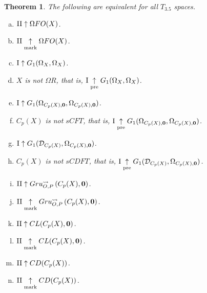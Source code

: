 \documentclass{amsart}
\theoremstyle{plain}
\newtheorem{theorem}{Theorem}
\theoremstyle{definition}
\theoremstyle{remark}
\theoremstyle{plain}
\theoremstyle{definition}
\theoremstyle{remark}
\begin{document}
\begin{theorem}
 The following are equivalent for all \(T_{3.5}\) spaces.
 \begin{enumerate}[a)]
  \item \(\mathrm{II}\uparrow \Omega FO(X)\).
  \item \(\mathrm{II}\underset{\text{mark}}{\uparrow} \Omega FO(X)\).
  \item \(\mathrm{I}\uparrow G_1(\Omega_X,\Omega_X)\).
  \item \(X\) is not \(\Omega R\), that is, \(\mathrm{I}\underset{\text{pre}}{\uparrow} G_1(\Omega_X,\Omega_X)\).
  \item \(\mathrm{I}\uparrow G_{1}(\Omega_{C_p(X),\mathbf 0},\Omega_{C_p(X),\mathbf 0})\).
  \item \(C_p(X)\) is not \(sCFT\), that is, \(\mathrm{I}\underset{\text{pre}}{\uparrow} G_{1}(\Omega_{C_p(X),\mathbf 0},\Omega_{C_p(X),\mathbf 0})\).
  \item \(\mathrm{I}\uparrow G_{1}(\mathcal{D}_{C_p(X)},\Omega_{C_p(X),\mathbf 0})\).
  \item \(C_p(X)\) is not \(sCDFT\), that is, \(\mathrm{I}\underset{\text{pre}}{\uparrow} G_{1}(\mathcal{D}_{C_p(X)},\Omega_{C_p(X),\mathbf 0})\).
  \item \(\mathrm{II}\uparrow Gru_{O,P}^{\leadsto}\left({C_p(X)},{\mathbf 0}\right)\).
  \item \(\mathrm{II}\underset{\text{mark}}{\uparrow}Gru_{O,P}^{\leadsto}\left({C_p(X)},{\mathbf 0}\right)\).
  \item \(\mathrm{II}\uparrow CL(C_p(X),\mathbf 0)\).
  \item \(\mathrm{II}\underset{\text{mark}}{\uparrow} CL(C_p(X),\mathbf 0)\).
  \item \(\mathrm{II}\uparrow CD(C_p(X))\).
  \item \(\mathrm{II}\underset{\text{mark}}{\uparrow} CD(C_p(X))\).
 \end{enumerate}
\end{theorem}
\end{document}

